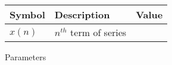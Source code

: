 \setlength{\arrayrulewidth}{0.3mm}
\setlength{\tabcolsep}{15pt}
\renewcommand{\arraystretch}{1.5}



\begin{tabular}{ |p{1cm}|p{3cm}|p{1cm}| }
\hline
Symbol & Description & Value\\
\hline
$x(n)$ & $n^{th}$ term of series & \\
\hline
\end{tabular}
\caption{Parameters}


